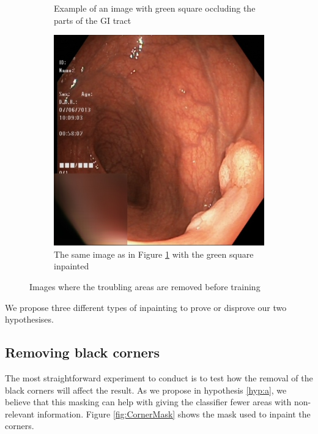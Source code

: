 \begin{figure}
\begin{subfigure}[t]{0.4\textwidth}
         \caption{Example of an image with green square occluding the parts of the GI tract}
         \label{fig:GreenSquareOccluding}
     \end{subfigure}     
     \hfill
     \begin{subfigure}[t]{0.4\textwidth}
         \centering
         \includegraphics[height=\textwidth, width=\textwidth]{experiments/figures/nogreenframe.jpg}
         \caption{The same image as in Figure \ref{fig:GreenSquareOccluding} with the green square inpainted}
         \label{fig:GreenSquareOccludingFIX}
     \end{subfigure}
        \caption{Images where the troubling areas are removed before training}
        \label{fig:KvasirAnomaliesFIX}
\end{figure}


We propose three different types of inpainting to prove or disprove our two hypothesises.
\FloatBarrier
\subsection{Removing black corners}
The most straightforward experiment to conduct is to test how the removal of the black corners will affect the result.
As we propose in hypothesis \ref{hyp:a}, we believe that this masking can help with giving the classifier fewer areas with non-relevant information.
Figure \ref{fig:CornerMask} shows the mask used to inpaint the corners.

